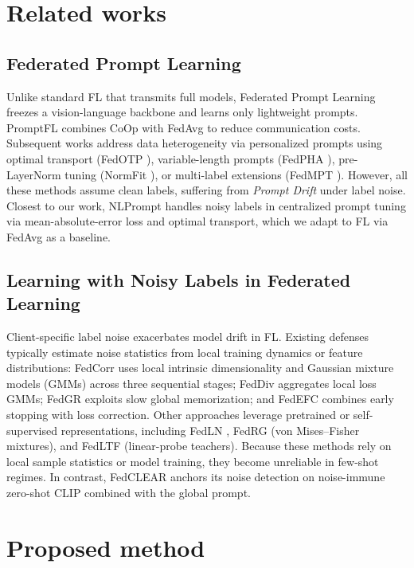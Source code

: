 \documentclass[runningheads]{llncs}
\begin{document}
\section{Related works}
\subsection{Federated Prompt Learning}
Unlike standard FL \cite{mcmahan2017communication} that transmits full models, Federated Prompt Learning freezes a vision-language backbone and learns only lightweight prompts. PromptFL \cite{guo2023promptfl} combines CoOp \cite{zhou2022learning} with FedAvg to reduce communication costs. Subsequent works address data heterogeneity via personalized prompts using optimal transport (FedOTP \cite{li2024fedotp}), variable-length prompts (FedPHA \cite{liu2025fedpha}), pre-LayerNorm tuning (NormFit \cite{motamedi2025normfit}), or multi-label extensions (FedMPT \cite{wang2026fedmpt}). However, all these methods assume clean labels, suffering from \textit{Prompt Drift} under label noise. Closest to our work, NLPrompt \cite{pan2025nlprompt} handles noisy labels in centralized prompt tuning via mean-absolute-error loss and optimal transport, which we adapt to FL via FedAvg as a baseline.

\subsection{Learning with Noisy Labels in Federated Learning}
Client-specific label noise exacerbates model drift in FL. Existing defenses typically estimate noise statistics from local training dynamics or feature distributions: FedCorr \cite{xu2022fedcorr} uses local intrinsic dimensionality and Gaussian mixture models (GMMs) across three sequential stages; FedDiv \cite{lijichang2024feddiv} aggregates local loss GMMs; FedGR \cite{tian2026fedgr} exploits slow global memorization; and FedEFC \cite{wacv2025fedefc} combines early stopping with loss correction. Other approaches leverage pretrained or self-supervised representations, including FedLN \cite{tsouvalas2022federated}, FedRG \cite{wen2026fedrg} (von Mises--Fisher mixtures), and FedLTF \cite{zhan2025fedltf} (linear-probe teachers). Because these methods rely on local sample statistics or model training, they become unreliable in few-shot regimes. In contrast, FedCLEAR anchors its noise detection on noise-immune zero-shot CLIP combined with the global prompt.

\section{Proposed method}
\end{document}
